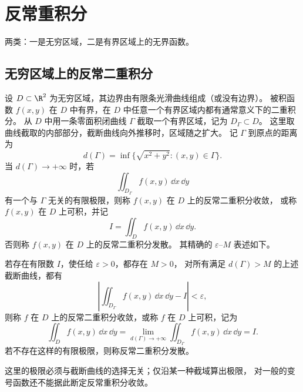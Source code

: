 \section{反常重积分}

两类：一是无穷区域，二是有界区域上的无界函数。

\subsection*{无穷区域上的反常二重积分}

设 $D\subset\R^2$ 为无穷区域，其边界由有限条光滑曲线组成（或没有边界）。
被积函数 $f(x,y)$ 在 $D$ 中有界，在 $D$ 中任意一个有界区域内都有通常意义下的二重积分。
从 $D$ 中用一条零面积闭曲线 $\Gamma$ 截取一个有界区域，记为 $D_\Gamma\subset D$。
这里取曲线截取的内部部分，截断曲线向外推移时，区域随之扩大。
记 $\Gamma$ 到原点的距离为
\[
d(\Gamma)=\inf\{\sqrt{x^2+y^2}:(x,y)\in\Gamma\}.
\]
当 $d(\Gamma)\to+\infty$ 时，若
\[
\displaystyle\iint_{D_\Gamma}f(x,y)\,\dd x\,\dd y
\]
有一个与 $\Gamma$ 无关的有限极限，则称 $f(x,y)$ 在 $D$ 上的反常二重积分收敛，
或称 $f(x,y)$ 在 $D$ 上可积，并记
\[
I=\displaystyle\iint_Df(x,y)\,\dd x\,\dd y.
\]
否则称 $f(x,y)$ 在 $D$ 上的反常二重积分发散。
其精确的 $\varepsilon$--$M$ 表述如下。

\begin{definition}[无穷区域上的反常二重积分]
若存在有限数 $I$，使任给 $\varepsilon>0$，都存在 $M>0$，
对所有满足 $d(\Gamma)>M$ 的上述截断曲线，都有
\[
\left|\displaystyle\iint_{D_\Gamma}f(x,y)\,\dd x\,\dd y-I\right|<\varepsilon,
\]
则称 $f$ 在 $D$ 上的反常二重积分收敛，或称 $f$ 在 $D$ 上可积，记为
\[
\displaystyle\iint_Df(x,y)\,\dd x\,\dd y
=\lim_{d(\Gamma)\to+\infty}\displaystyle\iint_{D_\Gamma}f(x,y)\,\dd x\,\dd y=I.
\]
若不存在这样的有限极限，则称反常二重积分发散。
\end{definition}

这里的极限必须与截断曲线的选择无关；仅沿某一种截域算出极限，
对一般的变号函数还不能据此断定反常重积分收敛。

